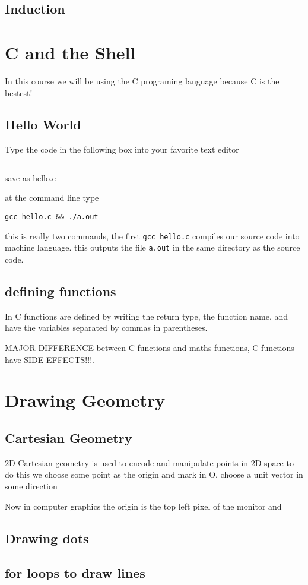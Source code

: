 \documentclass[12pt]{article}
\begin{document}
\subsection{Induction}

\section{C and the Shell}
    In this course we will be using the C programing language because C is the bestest!
\subsection{Hello World}
    Type the code in the following box into your favorite text editor
\inputminted{c}{hello.c}
    save as hello.c

    at the command line type

    \texttt{gcc hello.c \&\& ./a.out}

    this is really two commands, the first \texttt{gcc hello.c} compiles our source code into
    machine language. this outputs the file \texttt{a.out} in the same directory as the 
    source code.
\subsection{defining functions}
    In C functions are defined by writing the return type, the function name, and have 
    the variables separated by commas in parentheses.

    MAJOR DIFFERENCE between C functions and maths functions, C functions have SIDE EFFECTS!!!.

\section{Drawing Geometry}
\subsection{Cartesian Geometry}
    2D Cartesian geometry is used to encode and manipulate points in 2D space
    to do this we choose some point as the origin and mark in O, choose a unit 
    vector in some direction 

    Now in computer graphics the origin is the top left pixel of the monitor 
    and 
\subsection{Drawing dots}
\subsection{for loops to draw lines}
\end{document}
